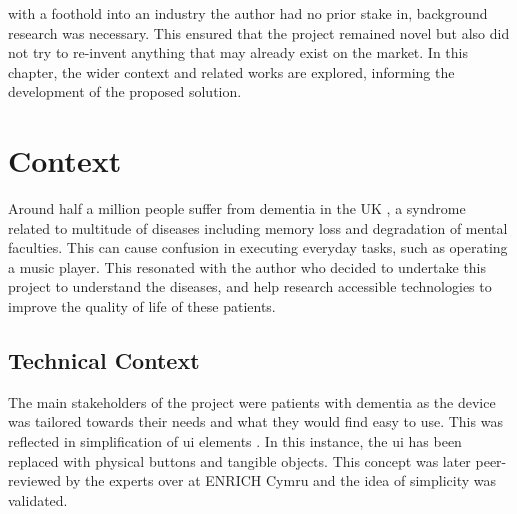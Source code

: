 %
 with a foothold into an industry the author had no prior stake in, background research was necessary. This ensured that the project remained novel but also did not try to re-invent anything that may already exist on the market. In this chapter, the wider context and related works are explored, informing the development of the proposed solution.

\section{Context}\label{sec:context}
Around half a million people suffer from dementia in the UK \citep{NHS2026}, a syndrome related to multitude of diseases including memory loss and degradation of mental faculties. This can cause confusion in executing everyday tasks, such as operating a music player. This resonated with the author who decided to undertake this project to understand the diseases, and help research accessible technologies to improve the quality of life of these patients.

\subsection{Technical Context}\label{subsec:tecContext}
The main stakeholders of the project were patients with dementia as the device was tailored towards their needs and what they would find easy to use. This was reflected in simplification of \gls{ui} elements \citep{10.1007/978-3-642-39473-7_39}. In this instance, the \gls{ui} has been replaced with physical buttons and tangible objects. This concept was later peer-reviewed by the experts over at ENRICH Cymru and the idea of simplicity was validated. 

